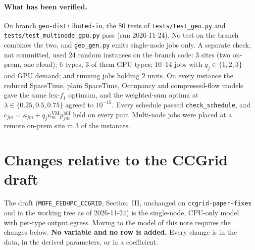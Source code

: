 \documentclass[11pt,a4paper]{article}
\newcommand{\code}[1]{\texttt{#1}}
\newcommand{\bill}{\mathrm{bill}}
\begin{document}
\paragraph{What has been verified.} On branch \code{geo-distributed-io}, the
80 tests of \code{tests/test\_geo.py} and \code{tests/test\_multinode\_gpu.py}
pass (run 2026-11-24). No test on the branch combines the two, and
\code{geo\_gen.py} emits single-node jobs only. A separate check, not
committed, used 24 random instances on the branch code: 3 sites (two on-prem,
one cloud); 6 types, 3 of them GPU types; 10--14 jobs with
$q_j\in\{1,2,3\}$ and GPU demand; and running jobs holding 2 units. On every
instance the reduced SpaceTime, plain SpaceTime, Occupancy and compressed-flow
models gave the same lex-$f_1$ optimum, and the weighted-sum optima at
$\lambda\in\{0.25,0.5,0.75\}$ agreed to $10^{-15}$. Every schedule passed
\code{check\_schedule}, and $c_{jm}=\kappa_{jm}+q_j\kappa^{\mathrm{VM}}_mp^\bill_{jm}$
held on every pair. Multi-node jobs were placed at a remote on-prem site in
3 of the instances.

\section{Changes relative to the CCGrid draft}\label{sec:diff}

The draft (\code{MOFE\_FEDHPC\_CCGRID}, Section~III, unchanged on
\code{ccgrid-paper-fixes} and in the working tree as of 2026-11-24) is the
single-node, CPU-only model with per-type output egress. Moving to the model
of this note requires the changes below. \textbf{No variable and no row is
added.} Every change is in the data, in the derived parameters, or in a
coefficient.
\end{document}
